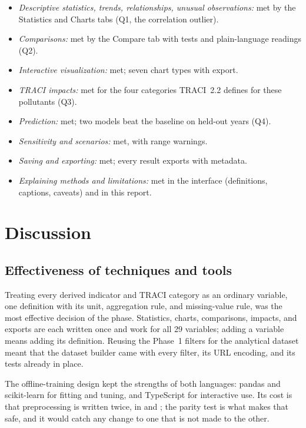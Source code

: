 \documentclass[11pt,a4paper]{article}
\begin{document}
\begin{itemize}
  \item \emph{Descriptive statistics, trends, relationships, unusual observations:} met by the
        Statistics and Charts tabs (Q1, the correlation outlier).
  \item \emph{Comparisons:} met by the Compare tab with tests and plain-language readings (Q2).
  \item \emph{Interactive visualization:} met; seven chart types with export.
  \item \emph{TRACI impacts:} met for the four categories TRACI~2.2 defines for these pollutants
        (Q3).
  \item \emph{Prediction:} met; two models beat the baseline on held-out years (Q4).
  \item \emph{Sensitivity and scenarios:} met, with range warnings.
  \item \emph{Saving and exporting:} met; every result exports with metadata.
  \item \emph{Explaining methods and limitations:} met in the interface (definitions, captions,
        caveats) and in this report.
\end{itemize}

\section{Discussion}
\label{sec:discussion}

\subsection{Effectiveness of techniques and tools}

Treating every derived indicator and TRACI category as an ordinary variable, one definition
with its unit, aggregation rule, and missing-value rule, was the most effective decision of the
phase. Statistics, charts, comparisons, impacts, and exports are each written once and work for
all 29 variables; adding a variable means adding its definition. Reusing the Phase~1 filters
for the analytical dataset meant that the dataset builder came with every filter, its URL
encoding, and its tests already in place.

The offline-training design kept the strengths of both languages: pandas and scikit-learn for
fitting and tuning, and TypeScript for interactive use. Its cost is that preprocessing is
written twice, in  and ; the parity test is what makes that safe,
and it would catch any change to one that is not made to the other.
\end{document}

